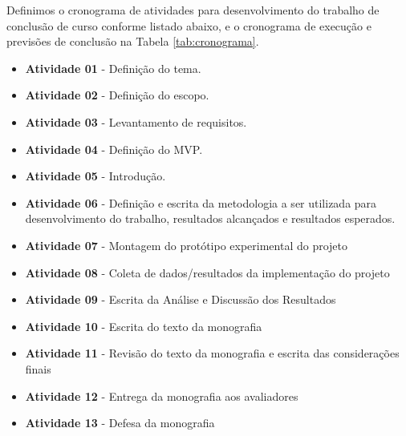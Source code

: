 Definimos o cronograma de atividades para desenvolvimento do trabalho de conclusão de curso conforme listado abaixo, e o cronograma de execução e previsões de conclusão na Tabela \ref{tab:cronograma}.

\begin{itemize}
    \item \textbf{Atividade 01} - Definição do tema.
    
    \item \textbf{Atividade 02} - Definição do escopo.
   
    \item \textbf{Atividade 03} - Levantamento de requisitos.
    
    \item \textbf{Atividade 04} - Definição do MVP.
    
    \item \textbf{Atividade 05} - Introdução.
    
    \item \textbf{Atividade 06} - Definição e escrita da metodologia a ser utilizada para desenvolvimento do trabalho, resultados alcançados e  resultados esperados.
    
    \item \textbf{Atividade 07} - Montagem do protótipo experimental do projeto
    
    \item \textbf{Atividade 08} - Coleta de dados/resultados da implementação do projeto
    
    \item \textbf{Atividade 09} - Escrita da Análise e Discussão dos Resultados
    
    \item \textbf{Atividade 10} - Escrita do texto da monografia
    
    \item \textbf{Atividade 11} - Revisão do texto da monografia e escrita das considerações finais
    
    \item \textbf{Atividade 12} - Entrega da monografia aos avaliadores
    
    \item \textbf{Atividade 13} - Defesa da monografia
    
\end{itemize}


